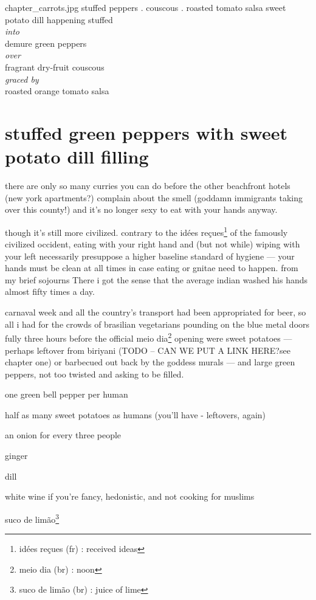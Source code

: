 \mychapter
{chapter_carrots.jpg}
{stuffed peppers . couscous . roasted tomato salsa}
{sweet potato dill happening stuffed\\
\textit{into}\\
demure green peppers\\
\textit{over}\\
fragrant dry-fruit couscous\\
\textit{graced by}\\
roasted orange tomato salsa}

\section{stuffed green peppers with sweet potato dill filling}

there are only so many curries you can do before the other beachfront hotels 
(new york apartments?) complain about the smell (goddamn immigrants taking 
over this county!) and it's no longer sexy to eat with your hands anyway.

though it's still more civilized. contrary to the id\'{e}es 
re\c{c}ues\footnote{id\'{e}es re\c{c}ues (fr) : received ideas} of 
the famously civilized occident, eating with your right hand and (but not 
while) wiping with your left necessarily presuppose a higher baseline 
standard of hygiene --- your hands must be clean at all times in case eating 
or gnitae need to happen. from my brief sojourns There i got the sense that 
the average indian washed his hands almost fifty times a day.

carnaval week and all the country's transport had been appropriated for beer, 
so all i had for the crowds of brasilian vegetarians pounding on the blue 
metal doors fully three hours before the official meio dia\footnote{meio dia 
(br) : noon} opening were sweet potatoes --- perhaps leftover from biriyani 
(TODO -- CAN WE PUT A LINK HERE?see chapter one) or barbecued out back by the 
goddess murals --- and large green peppers, not too twisted and asking to be 
filled.

\begin{ingredients}
  \item one green bell pepper per human
  \item half as many sweet potatoes as humans (you'll have - leftovers, again)
  \item an onion for every three people
  \item ginger
  \item dill
  \item white wine if you're fancy, hedonistic, and not cooking for muslims
  \item suco de lim\~{a}o\footnote{suco de lim\~{a}o (br) : juice of lime}
\end{ingredients}

